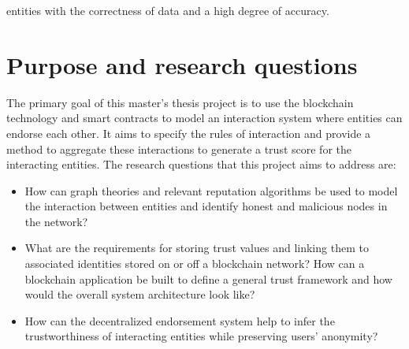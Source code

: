 entities with the correctness of data and a high degree of accuracy. 
\section{Purpose and research questions} \label{ResearchQuestions}
The primary goal of this master's thesis project is to use the blockchain
technology and smart contracts to model an interaction system where entities
can endorse each other. It aims to specify the rules of interaction and provide
a method to aggregate these interactions to generate a trust score for the
interacting entities. The research questions that this project aims to address
are: 
\begin{itemize}
		\item How can graph theories and relevant reputation algorithms be used
			to model the interaction between entities and identify honest and
			malicious nodes in the network? \label{question1}
		\item What are the requirements for storing trust values and linking
			them to associated identities stored on or off a blockchain
			network? How can a blockchain application be built to define a
			general trust framework and how would the overall system
			architecture look like?\label{question2} 
		\item How can the decentralized endorsement system help to infer the
			trustworthiness of interacting entities while preserving users'
			anonymity?  \label{question3} 
\end{itemize}
